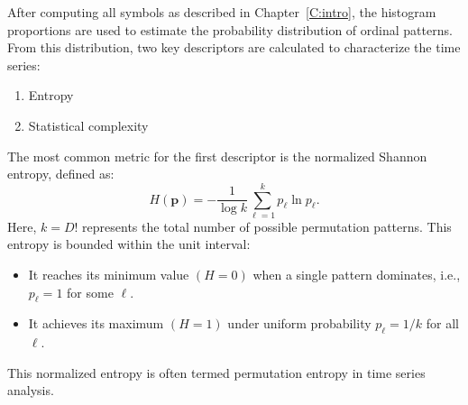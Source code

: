
After computing all symbols as described in Chapter~\ref{C:intro}, the histogram proportions are used to estimate the probability distribution of ordinal patterns. 
From this distribution, two key descriptors are calculated to characterize the time series:
\begin{enumerate}
	\item Entropy 
	
	\item Statistical complexity
\end{enumerate}
The most common metric for the first descriptor is the normalized Shannon entropy, defined as:
\begin{equation}
	H(\mathbf{p})=-\dfrac{1}{\log k}\sum^{k}_{\ell=1}p_{\ell} \ln{p_{\ell}}.
\end{equation}
Here, $k=D!$ represents the total number of possible permutation patterns.
This entropy is bounded within the unit interval:
\begin{itemize}
	\item It reaches its minimum value $(H=0)$ when a single pattern dominates, i.e., $p_{\ell}=1$ for some $\ell$.
	\item It achieves its maximum $(H=1)$ under uniform probability $p_{\ell}=1/k$ for all $\ell$. 
\end{itemize}
This normalized entropy is often termed permutation entropy in time series analysis. 

